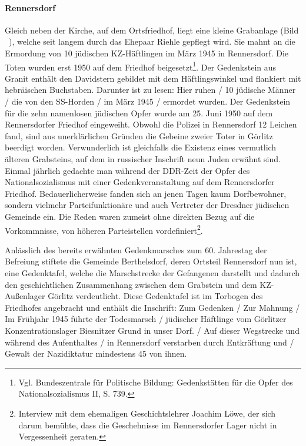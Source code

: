 \documentclass[a4paper,12pt,ngerman,
]{nisebook}
\begin{document}
\paragraph{Rennersdorf}
Gleich neben der Kirche, auf dem Ortsfriedhof, liegt eine kleine Grabanlage (Bild ~), welche seit langem durch das Ehepaar Riehle gepflegt wird. Sie mahnt an die Ermordung von 10 jüdischen KZ-Häftlingen im März 1945 in Rennersdorf. 
Die Toten wurden erst 1950 auf dem Friedhof beigesetzt\footnote{Vgl. Bundeszentrale für Politische Bildung: Gedenkstätten für die Opfer des Nationalsozialismus II, S. 739.}. Der Gedenkstein aus Granit enthält den Davidstern gebildet mit dem Häftlingswinkel und flankiert mit hebräischen Buchstaben. Darunter ist zu lesen: \glqq Hier ruhen / 10 jüdische Männer / die von den SS-Horden / im März 1945 / ermordet wurden\grqq. 
\newline
Der Gedenkstein für die zehn namenlosen jüdischen Opfer wurde am 25. Juni 1950 auf dem Rennersdorfer Friedhof eingeweiht. Obwohl die Polizei in Rennersdorf 12 Leichen fand, sind aus unerklärlichen Gründen die Gebeine zweier Toter in Görlitz beerdigt worden. Verwunderlich ist gleichfalls die Existenz eines vermutlich älteren Grabsteins, auf dem in russischer Inschrift neun Juden erwähnt sind. 
\newline
Einmal jährlich gedachte man während der DDR-Zeit der Opfer des Nationalsozialismus mit einer Gedenkveranstaltung auf dem Rennersdorfer Friedhof. Bedauerlicherweise fanden sich an jenen Tagen kaum Dorfbewohner, sondern vielmehr Parteifunktionäre und auch Vertreter der Dresdner jüdischen Gemeinde ein. Die Reden waren zumeist ohne direkten Bezug auf die Vorkommnisse, von höheren Parteistellen vordefiniert\footnote{Interview mit dem ehemaligen Geschichtslehrer Joachim Löwe, der sich darum bemühte, dass die Geschehnisse im Rennersdorfer Lager nicht in Vergessenheit geraten.}.\newline

Anlässlich des bereits erwähnten Gedenkmarsches zum 60. Jahrestag der Befreiung stiftete die Gemeinde Berthelsdorf, deren Ortsteil Rennersdorf nun ist, eine Gedenktafel, welche die Marschstrecke der Gefangenen darstellt und dadurch den geschichtlichen Zusammenhang zwischen dem Grabstein und dem KZ-Außenlager Görlitz verdeutlicht. Diese Gedenktafel ist im Torbogen des Friedhofes angebracht und enthält die Inschrift: \glqq Zum Gedenken / Zur Mahnung / Im Frühjahr 1945 führte der Todesmarsch / jüdischer Häftlinge vom Görlitzer Konzentrationslager Biesnitzer Grund in unser Dorf. / Auf dieser Wegstrecke und während des Aufenthaltes / in Rennersdorf verstarben durch Entkräftung und / Gewalt der Nazidiktatur mindestens 45 von ihnen.\grqq
\end{document}
